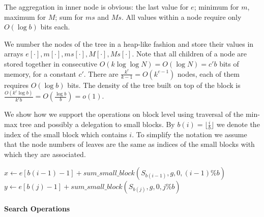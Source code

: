 The aggregation in inner node is obvious: the last value for $e$; minimum for $m$, maximum for $M$; sum for $ms$ and $Ms$.
All values within a node require only $O(\log b)$ bits each.

We number the nodes of the tree in a heap-like fashion and store their values in arrays $e[\cdot], m[\cdot], ms[\cdot], M[\cdot], Ms[\cdot]$.
Note that all children of a node are stored together in consecutive $O(k \log \log N) = O(\log N) = c' b$ bits of memory, for a constant $c'$.
There are $\frac{k^c}{k-1} = O(k^{c-1})$ nodes, each of them requires $O(\log b)$ bits.
The density of the tree built on top of the block is $\frac{O(k^c \log b)}{k^c b} = O(\frac{\log b}{b}) = o(1)$.

\bigskip

We show how we support the operations on block level using traversal of the min-max tree and possibly a delegation to small blocks.
By $b(i) = \lfloor\frac{i}{b}\rfloor$ we denote the index of the small block which contains $i$.
To simplify the notation we assume that the node numbers of leaves are the same as indices of the small blocks with which they are associated.

\begin{algorithmic}
	\State $x \gets e[b(i - 1) - 1] + sum\_small\_block(S_{b(i - 1)}, g, 0, (i - 1) \% b)$
	\State $y \gets e[b(j) - 1] + sum\_small\_block(S_{b(j)}, g, 0, j \% b)$
	\State {}
\EndFunction
\end{algorithmic}

\paragraph{Search Operations}

